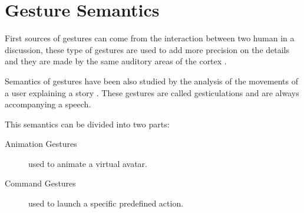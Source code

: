 \documentclass{llncs}
\newcommand\ignore[1]{}
\begin{document}
\section{Gesture Semantics}
First sources of gestures can come from the interaction between two human in a
discussion, these type of gestures are used to add more precision on the details
and they are made by the same auditory areas of the cortex \cite{SymbolicGest}.

Semantics of gestures have been also studied by the analysis of the movements of
a user explaining a story \cite{gestureThought}.
These gestures are called gesticulations and are always accompanying a speech. 

This semantics can be divided into two parts:
\begin{description}
 \item[Animation Gestures] used to animate a virtual avatar.
 \item[Command Gestures] used to launch a specific predefined action.
\end{description}


\ignore{
Gesture recognition got the attention of HCI researchers in order to find better
ways to talk to the computer. The first one was the Hand Gestural Cursor
(Put-That-There[]) aiming to the simplification of the means of communication
between human and the machine.
Since then, the gesture definition included more techniques and got applied on
the 2D recognition which is the multi-touch gestures.
}
\end{document}
